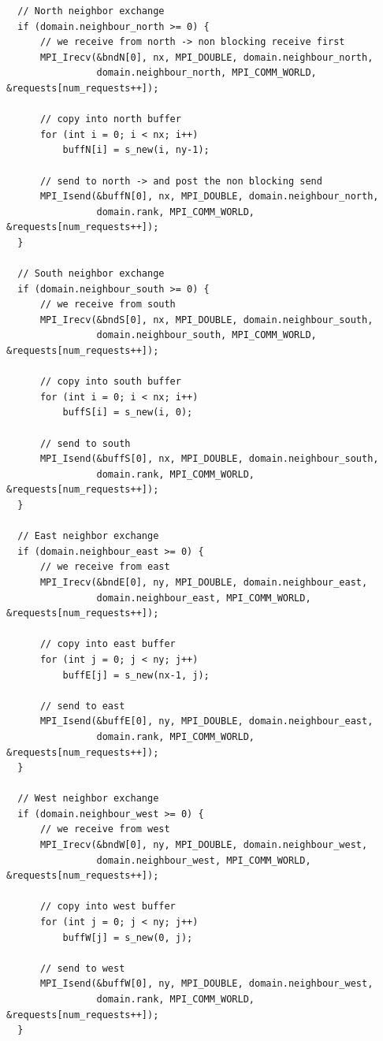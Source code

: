 \documentclass[unicode,11pt,a4paper,oneside,numbers=endperiod,openany]{scrartcl}
\begin{document}
\begin{verbatim}
  // North neighbor exchange
  if (domain.neighbour_north >= 0) {
      // we receive from north -> non blocking receive first 
      MPI_Irecv(&bndN[0], nx, MPI_DOUBLE, domain.neighbour_north, 
                domain.neighbour_north, MPI_COMM_WORLD, &requests[num_requests++]);
      
      // copy into north buffer
      for (int i = 0; i < nx; i++) 
          buffN[i] = s_new(i, ny-1);
      
      // send to north -> and post the non blocking send
      MPI_Isend(&buffN[0], nx, MPI_DOUBLE, domain.neighbour_north,
                domain.rank, MPI_COMM_WORLD, &requests[num_requests++]);
  }

  // South neighbor exchange
  if (domain.neighbour_south >= 0) {
      // we receive from south
      MPI_Irecv(&bndS[0], nx, MPI_DOUBLE, domain.neighbour_south,
                domain.neighbour_south, MPI_COMM_WORLD, &requests[num_requests++]);
      
      // copy into south buffer
      for (int i = 0; i < nx; i++)
          buffS[i] = s_new(i, 0);
      
      // send to south
      MPI_Isend(&buffS[0], nx, MPI_DOUBLE, domain.neighbour_south,
                domain.rank, MPI_COMM_WORLD, &requests[num_requests++]);
  }

  // East neighbor exchange
  if (domain.neighbour_east >= 0) {
      // we receive from east
      MPI_Irecv(&bndE[0], ny, MPI_DOUBLE, domain.neighbour_east,
                domain.neighbour_east, MPI_COMM_WORLD, &requests[num_requests++]);
      
      // copy into east buffer
      for (int j = 0; j < ny; j++)
          buffE[j] = s_new(nx-1, j);
      
      // send to east
      MPI_Isend(&buffE[0], ny, MPI_DOUBLE, domain.neighbour_east,
                domain.rank, MPI_COMM_WORLD, &requests[num_requests++]);
  }

  // West neighbor exchange
  if (domain.neighbour_west >= 0) {
      // we receive from west
      MPI_Irecv(&bndW[0], ny, MPI_DOUBLE, domain.neighbour_west,
                domain.neighbour_west, MPI_COMM_WORLD, &requests[num_requests++]);
      
      // copy into west buffer
      for (int j = 0; j < ny; j++)
          buffW[j] = s_new(0, j);
      
      // send to west
      MPI_Isend(&buffW[0], ny, MPI_DOUBLE, domain.neighbour_west,
                domain.rank, MPI_COMM_WORLD, &requests[num_requests++]);
  }
\end{verbatim}
\end{document}
